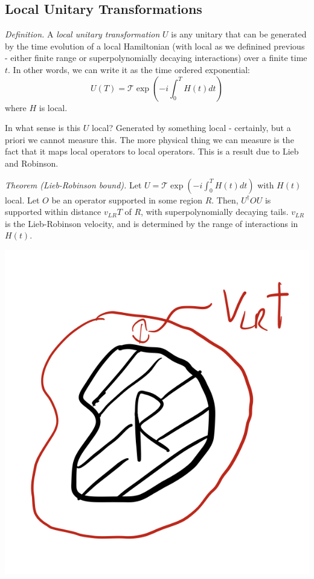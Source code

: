 \subsection{Local Unitary Transformations}
\emph{Definition.} A \emph{local unitary transformation} $U$ is any unitary that can be generated by the time evolution of a local Hamiltonian (with local as we definined previous - either finite range or superpolynomially decaying interactions) over a finite time $t$. In other words, we can write it as the time ordered exponential:
\begin{equation}
    U(T) = \mathcal{T}\exp(-i\int_0^T H(t)dt)
\end{equation}
where $H$ is local.

In what sense is this $U$ local? Generated by something local - certainly, but a priori we cannot measure this. The more physical thing we can measure is the fact that it maps local operators to local operators. This is a result due to Lieb and Robinson.

\textit{Theorem (Lieb-Robinson bound).} Let $U =  \mathcal{T}\exp(-i\int_0^T H(t)dt)$ with $H(t)$ local. Let $O$ be an operator supported in some region $R$. Then, $U^\dag O U$ is supported within distance $v_{LR}T$ of $R$, with superpolynomially decaying tails. $v_{LR}$ is the Lieb-Robinson velocity, and is determined by the range of interactions in $H(t)$.

\begin{center}
    \includegraphics[scale=0.35]{Lectures/Images/lec11-LRbound.png}
\end{center}

